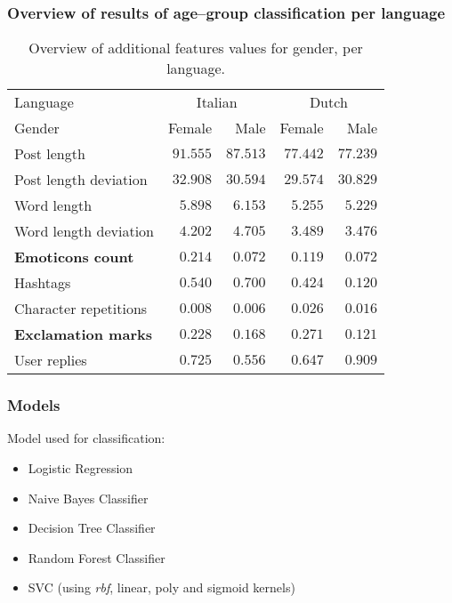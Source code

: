 \documentclass[utf8]{beamer}
\begin{document}
\begin{frame}
	\frametitle{Overview of results of age–group classification per language}
	\begin{table}
		\caption{Overview of additional features values for gender, per language.}
		\label{tab:additionalfeatures-gender}
		\begin{center}
			\begin{tabular}{l|rr|rr}
				\toprule
				Language & \multicolumn{2}{c|}{Italian} & \multicolumn{2}{c}{Dutch} \\
				Gender & Female & Male & Female & Male \\
				\midrule
				Post length & $ 91.555 $ & $ 87.513 $ & $ 77.442 $ & $ 77.239 $ \\
				Post length deviation & $ 32.908 $ & $ 30.594 $ & $ 29.574 $ & $ 30.829 $ \\
				Word length & $ 5.898 $ & $ 6.153 $ & $ 5.255 $ & $ 5.229 $ \\
				Word length deviation & $ 4.202 $ & $ 4.705 $ & $ 3.489 $ & $ 3.476 $ \\
				\textbf{Emoticons count} & $ 0.214 $ & $ 0.072 $ & $ 0.119 $ & $ 0.072 $ \\
				Hashtags & $ 0.540 $ & $ 0.700 $ & $ 0.424 $ & $ 0.120 $ \\
				Character repetitions & $ 0.008 $ & $ 0.006 $ & $ 0.026 $ & $ 0.016 $ \\
				\textbf{Exclamation marks} & $ 0.228 $ & $ 0.168 $ & $ 0.271 $ & $ 0.121 $ \\
				User replies & $ 0.725 $ & $ 0.556 $ & $ 0.647 $ & $ 0.909 $ \\
				\bottomrule
			\end{tabular}
		\end{center}
	\end{table}
\end{frame}


\begin{frame}
	\frametitle{Models}
	Model used for classification:
	\pause
	\begin{itemize}
		\item Logistic Regression
		\item Naive Bayes Classifier
		\item Decision Tree Classifier
		\item Random Forest Classifier
		\item SVC (using \textit{rbf}, linear, poly and sigmoid kernels)
	\end{itemize}
\end{frame}
\end{document}
